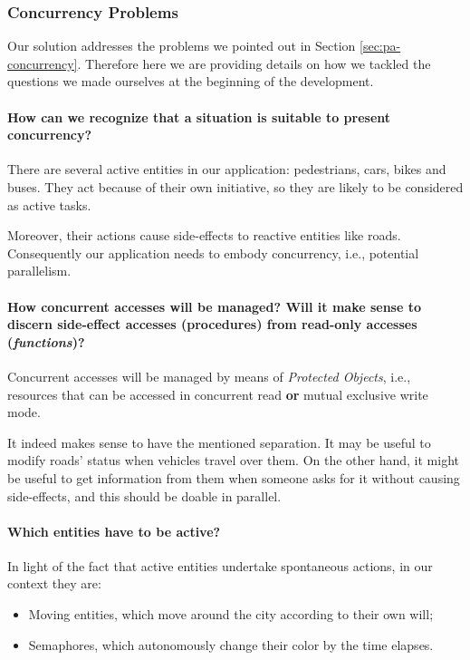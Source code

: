 
\subsubsection{Concurrency Problems}
\label{sec:sol-conc-problems}

Our solution addresses the problems we pointed out in Section
\ref{sec:pa-concurrency}.
Therefore here we are providing details on how we tackled the questions we
made ourselves at the beginning of the development.

\paragraph{How can we recognize that a situation is suitable to present
concurrency?}
There are several active entities in our application: pedestrians, cars, bikes
and buses. They act because of their own initiative, so they are likely to be
considered as active tasks.

Moreover, their actions cause side-effects to reactive entities like roads.
Consequently our application needs to embody concurrency, i.e., potential
parallelism.

\paragraph{How concurrent accesses will be managed? Will it make sense to
discern side-effect accesses (procedures) from read-only accesses
(\textit{functions})?}
Concurrent accesses will be managed by means of \textit{Protected Objects},
i.e., resources that can be accessed in concurrent read \textbf{or} mutual
exclusive write mode.

It indeed makes sense to have the mentioned separation.
It may be useful to modify roads' status when vehicles travel over them.
On the other hand, it might be useful to get information from them when
someone asks for it without causing side-effects, and this should be doable in
parallel.

\paragraph{Which entities have to be active?}
In light of the fact that active entities undertake spontaneous actions, in
our context they are:
\begin{itemize}
  \item Moving entities, which move around the city according to their own
    will;
  \item Semaphores, which autonomously change their color by the time elapses.
\end{itemize}

